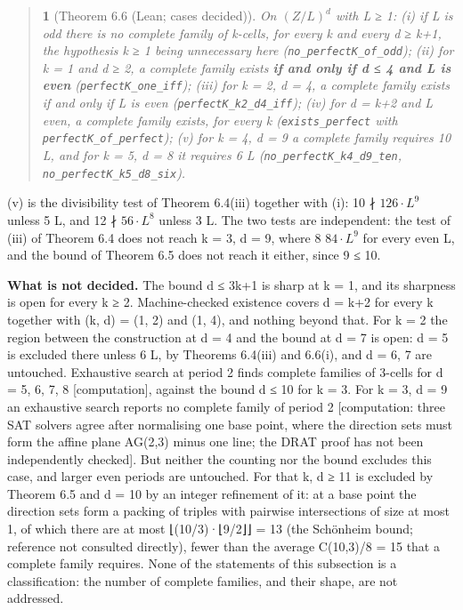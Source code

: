 \documentclass[11pt,a4paper]{article}
\theoremstyle{named}
\newtheorem*{namedthm}{}
\begin{document}
\begin{quote}
\begin{namedthm}[Theorem 6.6 (Lean; cases decided)]
On $(Z/L)^d$ with L ≥ 1: (i) if L is odd there is no complete family of k-cells, for every k and every d ≥ k+1, the hypothesis k ≥ 1 being unnecessary here (\texttt{no\_\allowbreak{}perfectK\_\allowbreak{}of\_\allowbreak{}odd}); (ii) for k = 1 and d ≥ 2, a complete family exists \textbf{if and only if d ≤ 4 and L is even} (\texttt{perfectK\_\allowbreak{}one\_\allowbreak{}iff}); (iii) for k = 2, d = 4, a complete family exists if and only if L is even (\texttt{perfectK\_\allowbreak{}k2\_\allowbreak{}d4\_\allowbreak{}iff}); (iv) for d = k+2 and L even, a complete family exists, for every k (\texttt{exists\_\allowbreak{}perfect} with \texttt{perfectK\_\allowbreak{}of\_\allowbreak{}perfect}); (v) for k = 4, d = 9 a complete family requires 10 \textbar{} L, and for k = 5, d = 8 it requires 6 \textbar{} L (\texttt{no\_\allowbreak{}perfectK\_\allowbreak{}k4\_\allowbreak{}d9\_\allowbreak{}ten}, \texttt{no\_\allowbreak{}perfectK\_\allowbreak{}k5\_\allowbreak{}d8\_\allowbreak{}six}).
\end{namedthm}
\end{quote}
(v) is the divisibility test of Theorem 6.4(iii) together with (i): 10 ∤ $126·L^9$ unless 5 \textbar{} L, and 12 ∤ $56·L^8$ unless 3 \textbar{} L. The two tests are independent: the test of (iii) of Theorem 6.4 does not reach k = 3, d = 9, where 8 \textbar{} $84·L^9$ for every even L, and the bound of Theorem 6.5 does not reach it either, since 9 ≤ 10.

\textbf{What is not decided.} The bound d ≤ 3k+1 is sharp at k = 1, and its sharpness is open for every k ≥ 2. Machine-checked existence covers d = k+2 for every k together with (k, d) = (1, 2) and (1, 4), and nothing beyond that. For k = 2 the region between the construction at d = 4 and the bound at d = 7 is open: d = 5 is excluded there unless 6 \textbar{} L, by Theorems 6.4(iii) and 6.6(i), and d = 6, 7 are untouched. Exhaustive search at period 2 finds complete families of 3-cells for d = 5, 6, 7, 8 [computation], against the bound d ≤ 10 for k = 3. For k = 3, d = 9 an exhaustive search reports no complete family of period 2 [computation: three SAT solvers agree after normalising one base point, where the direction sets must form the affine plane AG(2,3) minus one line; the DRAT proof has not been independently checked]. But neither the counting nor the bound excludes this case, and larger even periods are untouched. For that k, d ≥ 11 is excluded by Theorem 6.5 and d = 10 by an integer refinement of it: at a base point the direction sets form a packing of triples with pairwise intersections of size at most 1, of which there are at most ⌊(10/3)·⌊9/2⌋⌋ = 13 (the Schönheim bound; reference not consulted directly), fewer than the average C(10,3)/8 = 15 that a complete family requires. None of the statements of this subsection is a classification: the number of complete families, and their shape, are not addressed.
\end{document}
